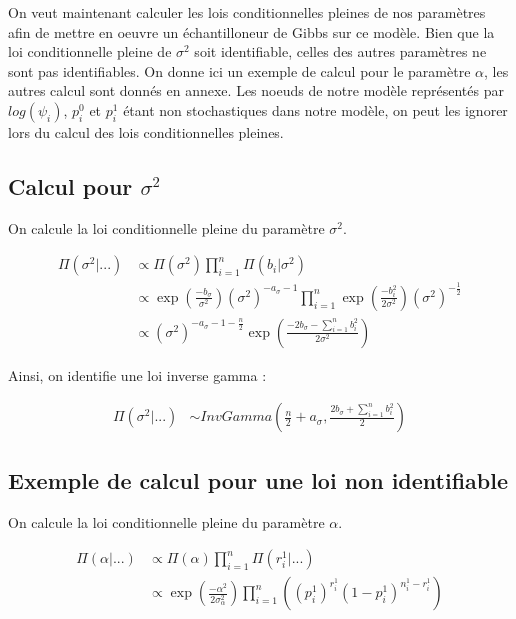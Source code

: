 \documentclass[
]{article}
\begin{document}
On veut maintenant calculer les lois conditionnelles pleines de nos
paramètres afin de mettre en oeuvre un échantilloneur de Gibbs sur ce
modèle. Bien que la loi conditionnelle pleine de \(\sigma^2\) soit
identifiable, celles des autres paramètres ne sont pas identifiables. On
donne ici un exemple de calcul pour le paramètre \(\alpha\), les autres
calcul sont donnés en annexe. Les noeuds de notre modèle représentés par
\(log(\psi_i)\), \(p_i^0\) et \(p_i^1\) étant non stochastiques dans
notre modèle, on peut les ignorer lors du calcul des lois
conditionnelles pleines.

\hypertarget{calcul-pour-sigma2}{%
\subsection{\texorpdfstring{Calcul pour
\(\sigma^2\)}{Calcul pour \textbackslash sigma\^{}2}}\label{calcul-pour-sigma2}}

On calcule la loi conditionnelle pleine du paramètre \(\sigma^2\).

\begin{align*}
\Pi(\sigma^2|...) &\propto \Pi(\sigma^2) \prod_{i=1}^n\Pi(b_i|\sigma^2) \\
&\propto \exp\left({\frac{-b_{\sigma}}{\sigma^2}}\right)(\sigma^2)^{-a_{\sigma}-1}\prod_{i=1}^{n} \exp\left(\frac{-b_i^2}{2\sigma^2}\right)(\sigma^2)^{-\frac{1}{2}} \\
&\propto (\sigma^2)^{-a_{\sigma}-1-\frac{n}{2}} \exp\left(\frac{-2b_{\sigma}-\sum\limits_{i=1}^n b_i^2}{2\sigma^2}\right)
\end{align*}

Ainsi, on identifie une loi inverse gamma :

\begin{align*}
\Pi(\sigma^2|...) &\sim InvGamma(\frac{n}{2}+a_{\sigma},\frac{2b_{\sigma}+\sum\limits_{i=1}^n b_i^2}{2})
\end{align*}

\hypertarget{exemple-de-calcul-pour-une-loi-non-identifiable}{%
\subsection{Exemple de calcul pour une loi non
identifiable}\label{exemple-de-calcul-pour-une-loi-non-identifiable}}

On calcule la loi conditionnelle pleine du paramètre \(\alpha\).

\begin{align*}
\Pi(\alpha|...) &\propto \Pi(\alpha) \prod_{i=1}^n\Pi(r_i^1|...) \\
&\propto \exp\left({\frac{-\alpha^2}{2\sigma_{\alpha}^2}}\right)\prod_{i=1}^n \left((p_i^1)^{r_i^1}(1-p_i^1)^{n_i^1-r_i^1}\right)
\end{align*}
\end{document}
